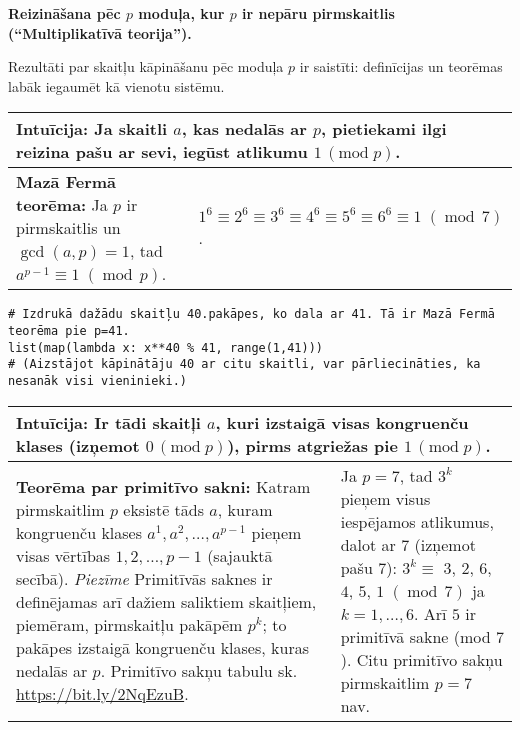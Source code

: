 \documentclass[a4paper]{article}
\begin{document}
{\bf \large Reizināšana pēc $p$ moduļa, kur $p$ ir nepāru pirmskaitlis (``Multiplikatīvā teorija'').}

\vspace{10pt}
Rezultāti par skaitļu kāpināšanu pēc moduļa $p$ ir saistīti: 
definīcijas un teorēmas labāk iegaumēt kā vienotu sistēmu.  

\renewcommand{\arraystretch}{1.2}
\begin{table}[ht!]\centering
{\small
\begin{tabular*}{18.46cm}{@{}|p{10.35cm}|p{7.25cm}|@{}} \hline
\multicolumn{2}{|p{18.05cm}|}{
\cellcolor[HTML]{E1FFE1}
Intuīcija: Ja skaitli $a$, kas nedalās ar $p$, pietiekami ilgi reizina pašu ar sevi, iegūst atlikumu $1\,(\text{mod}\;p)$.
} \\ \hline
{\bf Mazā Fermā teorēma:} Ja $p$ ir pirmskaitlis un $\operatorname{gcd}(a,p)=1$, tad\newline 
$a^{p-1} \equiv 1\;(\operatorname{mod}\,p)$. &
$1^6 \equiv 2^6 \equiv 3^6 \equiv 4^6 \equiv 5^6 \equiv 6^6 \equiv 1\;(\operatorname{mod}\,7)$. \\ \hline
\end{tabular*}
}
\end{table}

{\small
\vspace{-10pt}
\begin{Verbatim}
# Izdrukā dažādu skaitļu 40.pakāpes, ko dala ar 41. Tā ir Mazā Fermā teorēma pie p=41.
list(map(lambda x: x**40 % 41, range(1,41)))
# (Aizstājot kāpinātāju 40 ar citu skaitli, var pārliecināties, ka nesanāk visi vieninieki.)
\end{Verbatim}
}

\vspace{-10pt}
\renewcommand{\arraystretch}{1.2}
\begin{table}[ht!]\centering
{\small
\begin{tabular*}{18.46cm}{@{}|p{10.35cm}|p{7.25cm}|@{}} \hline
\multicolumn{2}{|p{18.05cm}|}{
\cellcolor[HTML]{E1FFE1}
Intuīcija: Ir tādi skaitļi $a$, kuri izstaigā visas kongruenču klases (izņemot $0\,(\text{mod}\;p)$), pirms atgriežas pie $1\,(\text{mod}\;p)$.
} \\ \hline
{\bf Teorēma par primitīvo sakni:} Katram pirmskaitlim $p$ eksistē tāds 
$a$, kuram kongruenču klases $a^1,a^2,\ldots,a^{p-1}$ pieņem visas
vērtības $1,2,\ldots,p-1$ (sajauktā secībā).\newline
{\em Piezīme} Primitīvās saknes ir definējamas arī dažiem saliktiem skaitļiem, piemēram, 
pirmskaitļu pakāpēm $p^k$; to pakāpes izstaigā kongruenču klases, kuras 
nedalās ar $p$.\newline 
Primitīvo sakņu tabulu sk. \url{https://bit.ly/2NqEzuB}.
 &
Ja $p=7$, tad $3^k$ pieņem visus iespējamos atlikumus, dalot ar $7$ (izņemot pašu $7$):\newline
$3^k \equiv$ $3$, $2$, $6$, $4$, $5$, $1\;(\operatorname{mod}\,7)$ ja $k=1,\ldots,6$.\newline
Arī $5$ ir primitīvā sakne (mod $7$). Citu primitīvo sakņu pirmskaitlim $p=7$ nav. \\ \hline
\end{tabular*}
}
\end{table}
\end{document}
